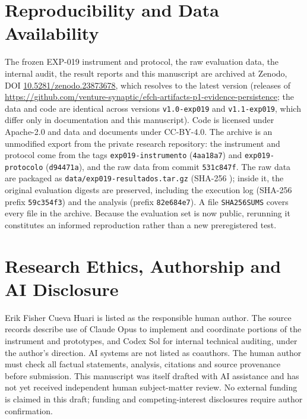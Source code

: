 \documentclass[10pt,twocolumn]{article}
\begin{document}
\section{Reproducibility and Data Availability}
The frozen EXP-019 instrument and protocol, the raw evaluation data, the internal audit, the result reports and this manuscript are archived at Zenodo, DOI \href{https://doi.org/10.5281/zenodo.23873678}{10.5281/zenodo.23873678}, which resolves to the latest version (releases of \url{https://github.com/venture-synaptic/efch-artifacts-p1-evidence-persistence}; the data and code are identical across versions \texttt{v1.0-exp019} and \texttt{v1.1-exp019}, which differ only in documentation and this manuscript). Code is licensed under Apache-2.0 and data and documents under CC-BY-4.0. The archive is an unmodified export from the private research repository: the instrument and protocol come from the tags \texttt{exp019-instrumento} (\texttt{4aa18a7}) and \texttt{exp019-protocolo} (\texttt{d94471a}), and the raw data from commit \texttt{531c847f}. The raw data are packaged as \texttt{data/exp019-resultados.tar.gz} (SHA-256 \texttt{}); inside it, the original evaluation digests are preserved, including the execution log (SHA-256 prefix \texttt{59c354f3}) and the analysis (prefix \texttt{82e684e7}). A file \texttt{SHA256SUMS} covers every file in the archive. Because the evaluation set is now public, rerunning it constitutes an informed reproduction rather than a new preregistered test.

\section{Research Ethics, Authorship and AI Disclosure}
Erik Fisher Cueva Huari is listed as the responsible human author. The source records describe use of Claude Opus to implement and coordinate portions of the instrument and prototypes, and Codex Sol for internal technical auditing, under the author's direction. AI systems are not listed as coauthors. The human author must check all factual statements, analysis, citations and source provenance before submission. This manuscript was itself drafted with AI assistance and has not yet received independent human subject-matter review. No external funding is claimed in this draft; funding and competing-interest disclosures require author confirmation.
\end{document}
